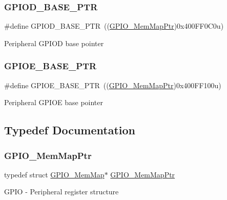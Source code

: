 \subsubsection{\texorpdfstring{G\+P\+I\+O\+D\+\_\+\+B\+A\+S\+E\+\_\+\+P\+TR}{GPIOD\_BASE\_PTR}}
{\footnotesize\ttfamily \#define G\+P\+I\+O\+D\+\_\+\+B\+A\+S\+E\+\_\+\+P\+TR~((\hyperlink{group___g_p_i_o___peripheral_ga31c1eddda45aa085f51142987e05ada5}{G\+P\+I\+O\+\_\+\+Mem\+Map\+Ptr})0x400\+F\+F0\+C0u)}

Peripheral G\+P\+I\+OD base pointer \mbox{\label{group___g_p_i_o___peripheral_ga5d17758f0829d938753761d4a53c0a7c}} 
\subsubsection{\texorpdfstring{G\+P\+I\+O\+E\+\_\+\+B\+A\+S\+E\+\_\+\+P\+TR}{GPIOE\_BASE\_PTR}}
{\footnotesize\ttfamily \#define G\+P\+I\+O\+E\+\_\+\+B\+A\+S\+E\+\_\+\+P\+TR~((\hyperlink{group___g_p_i_o___peripheral_ga31c1eddda45aa085f51142987e05ada5}{G\+P\+I\+O\+\_\+\+Mem\+Map\+Ptr})0x400\+F\+F100u)}

Peripheral G\+P\+I\+OE base pointer 

\subsection{Typedef Documentation}
\mbox{\label{group___g_p_i_o___peripheral_ga31c1eddda45aa085f51142987e05ada5}} 
\subsubsection{\texorpdfstring{G\+P\+I\+O\+\_\+\+Mem\+Map\+Ptr}{GPIO\_MemMapPtr}}
{\footnotesize\ttfamily typedef struct \hyperlink{struct_g_p_i_o___mem_map}{G\+P\+I\+O\+\_\+\+Mem\+Map}$\ast$ \hyperlink{group___g_p_i_o___peripheral_ga31c1eddda45aa085f51142987e05ada5}{G\+P\+I\+O\+\_\+\+Mem\+Map\+Ptr}}

G\+P\+IO -\/ Peripheral register structure 